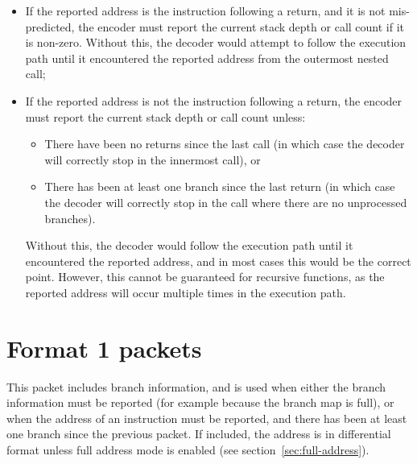 \begin{itemize}
  \item If the reported address is the instruction following a return, and it is not mis-predicted, the encoder must 
    report the current stack depth or call count if it is non-zero.  Without this, the decoder would attempt to follow 
    the execution path until it encountered the reported address from the outermost nested call;  
  \item If the reported address is not the instruction following a return, the encoder must report the current stack 
    depth or call count unless:
    \begin{itemize}
      \item There have been no returns since the last call (in which case the decoder will correctly stop in the 
        innermost call), or
      \item There has been at least one branch since the last return (in which case the decoder will correctly
        stop in the call where there are no unprocessed branches).
    \end{itemize}
    Without this, the decoder would follow the execution path until it encountered the reported address, and in most cases 
    this would be the correct point.  However, this cannot be guaranteed for recursive functions, as the reported address 
    will occur multiple times in the execution path.  
\end{itemize}

\FloatBarrier
\section{Format 1 packets} \label{sec:format1}

This packet includes branch information, and is used when either the branch information must be reported 
(for example because the branch map is full), or when the address of an instruction must be reported, and there has 
been at least one branch since the previous packet.  If included, the address is in differential format unless full 
address mode is enabled (see section~\ref{sec:full-address}).

